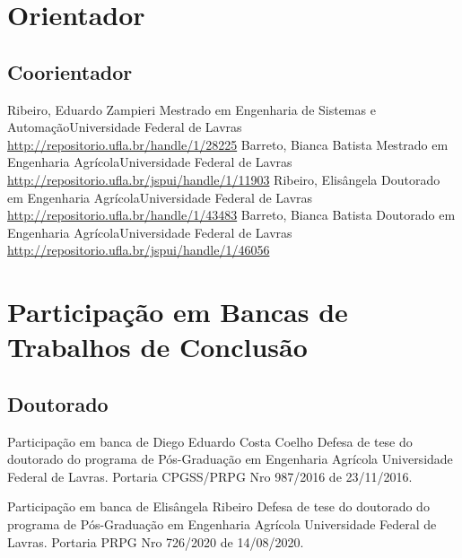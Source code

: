 \documentclass[11pt,a4paper,sans]{moderncv} %
\begin{document}
	       
\section{Orientador}
\subsection{Coorientador}
			{Ribeiro, Eduardo Zampieri}
			{Mestrado em Engenharia de Sistemas e Automação}{Universidade Federal de Lavras}
			{\url{http://repositorio.ufla.br/handle/1/28225}}
			{Barreto, Bianca Batista}
			{Mestrado em Engenharia Agrícola}{Universidade Federal de Lavras}
			{\url{http://repositorio.ufla.br/jspui/handle/1/11903}}
			{Ribeiro, Elisângela }
			{Doutorado em Engenharia Agrícola}{Universidade Federal de Lavras}
			{\url{http://repositorio.ufla.br/handle/1/43483}}
			{Barreto, Bianca Batista}
			{Doutorado em Engenharia Agrícola}{Universidade Federal de Lavras}
			{\url{http://repositorio.ufla.br/jspui/handle/1/46056}}
			
\section{Participação em Bancas de Trabalhos de Conclusão}
\subsection{Doutorado}
			{Participação em banca de Diego Eduardo Costa Coelho}
			{Defesa de tese do doutorado do programa de Pós-Graduação em Engenharia Agrícola}{}
			{Universidade Federal de Lavras. Portaria CPGSS/PRPG Nro 987/2016 de 23/11/2016.}

			{Participação em banca de Elisângela Ribeiro}
			{Defesa de tese do doutorado do programa de Pós-Graduação em Engenharia Agrícola}{}
			{Universidade Federal de Lavras. Portaria PRPG Nro 726/2020 de 14/08/2020.}
\end{document}
